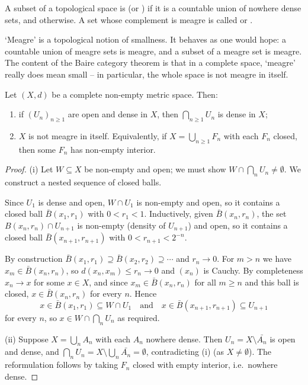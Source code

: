 \documentclass[a4paper]{scrartcl}
\begin{document}
\begin{definition}[Meagre]
	A subset of a topological space is  (or ) if it is a countable union of nowhere dense sets, and  otherwise. A set whose complement is meagre is called  or .
\end{definition}

`Meagre' is a topological notion of smallness. It behaves as one would hope: a countable union of meagre sets is meagre, and a subset of a meagre set is meagre. The content of the Baire category theorem is that in a complete space, `meagre' really does mean small -- in particular, the whole space is not meagre in itself.

\begin{theorem}
	Let $(X,d)$ be a complete non-empty metric space. Then:
	\begin{enumerate}[label=(\roman*)]
		\item if $(U_n)_{n \geq 1}$ are open and dense in $X$, then $\bigcap_{n \geq 1} U_n$ is dense in $X$;
		\item $X$ is not meagre in itself. Equivalently, if $X = \bigcup_{n\geq 1} F_n$ with each $F_n$ closed, then some $F_n$ has non-empty interior.
	\end{enumerate}
\end{theorem}

\begin{proof}
	(i) Let $W \subseteq X$ be non-empty and open; we must show $W \cap \bigcap_n U_n \neq \emptyset$. We construct a nested sequence of closed balls.

	Since $U_1$ is dense and open, $W \cap U_1$ is non-empty and open, so it contains a closed ball $\bar B(x_1, r_1)$ with $0 < r_1 < 1$. Inductively, given $\bar{B}(x_n, r_n)$, the set $B(x_n, r_n) \cap U_{n+1}$ is non-empty (density of $U_{n+1}$) and open, so it contains a closed ball $\bar B(x_{n+1}, r_{n+1})$ with $0 < r_{n+1} < 2^{-n}$.

	By construction $\bar B(x_1,r_1) \supseteq \bar B(x_2,r_2) \supseteq \cdots$ and $r_n \to 0$. For $m > n$ we have $x_m \in \bar B(x_n, r_n)$, so $d(x_n, x_m) \leq r_n \to 0$ and $(x_n)$ is Cauchy. By completeness $x_n \to x$ for some $x \in X$, and since $x_m \in \bar B(x_n, r_n)$ for all $m \geq n$ and this ball is closed, $x \in \bar B(x_n, r_n)$ for every $n$. Hence
	$$x \in \bar B(x_1, r_1) \subseteq W \cap U_1 \quad \text{and} \quad x \in \bar B(x_{n+1},r_{n+1}) \subseteq U_{n+1}$$
	for every $n$, so $x \in W \cap \bigcap_n U_n$ as required.

	(ii) Suppose $X = \bigcup_n A_n$ with each $A_n$ nowhere dense. Then $U_n = X \setminus \bar{A_n}$ is open and dense, and $\bigcap_n U_n = X \setminus \bigcup_n \bar{A_n} = \emptyset$, contradicting (i) (as $X \neq \emptyset$). The reformulation follows by taking $F_n$ closed with empty interior, i.e.\ nowhere dense.
\end{proof}
\end{document}
